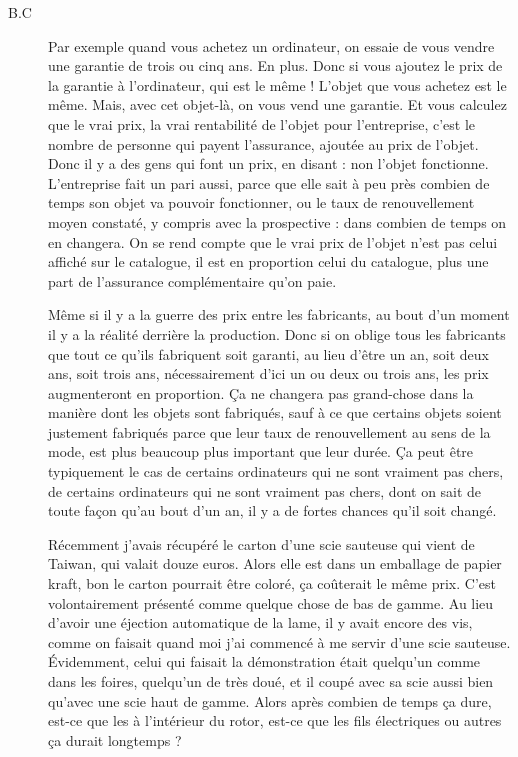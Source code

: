\begin{description}
\item[B.C]Par exemple quand vous achetez un ordinateur, on essaie de vous vendre une garantie de trois ou cinq ans. En plus. Donc si vous ajoutez le prix de la garantie à l'ordinateur, qui est le même ! L'objet que vous achetez est le même. Mais, avec cet objet-là, on vous vend une garantie. Et vous calculez que le vrai prix, la vrai rentabilité de l'objet pour l'entreprise, c'est le nombre de personne qui payent l'assurance, ajoutée au prix de l'objet. Donc il y a des gens qui font un prix, en disant : non l'objet fonctionne. L'entreprise fait un pari aussi, parce que elle sait à peu près combien de temps son objet va pouvoir fonctionner, ou le taux de renouvellement moyen constaté, y compris avec la prospective : dans combien de temps on en changera. On se rend compte que le vrai prix de l'objet n'est pas celui affiché sur le catalogue, il est en proportion celui du catalogue, plus une part de l'assurance complémentaire qu'on paie. 


Même si il y a la guerre des prix entre les fabricants, au bout d'un moment il y a la réalité derrière la production. Donc si on oblige tous les fabricants que tout ce qu’ils fabriquent soit garanti, au lieu d'être un an, soit deux ans, soit trois ans, nécessairement d'ici un ou deux ou trois ans, les prix augmenteront en proportion. Ça ne changera pas grand-chose dans la manière dont les objets sont fabriqués, sauf à ce que certains objets soient justement fabriqués parce que leur taux de renouvellement au sens de la mode, est plus beaucoup plus important que leur durée. Ça peut être typiquement le cas de certains ordinateurs qui ne sont vraiment pas chers, de certains ordinateurs qui ne sont vraiment pas chers, dont on sait de toute façon qu'au bout d'un an, il y a de fortes chances qu'il soit changé. 

Récemment j'avais récupéré le carton d'une scie sauteuse qui vient de Taiwan, qui valait douze euros. Alors elle est dans un emballage de papier kraft, bon le carton pourrait être coloré, ça coûterait le même prix. C'est volontairement présenté comme quelque chose de bas de gamme. Au lieu d'avoir une éjection automatique de la lame, il y avait encore des vis, comme on faisait quand moi j'ai commencé à me servir d'une scie sauteuse. Évidemment, celui qui faisait la démonstration était quelqu'un comme dans les foires, quelqu'un de très doué, et il coupé avec sa scie aussi bien qu'avec une scie haut de gamme. Alors après combien de temps ça dure, est-ce que les  à l'intérieur du rotor, est-ce que les fils électriques ou autres ça durait longtemps ?


\end{description}
